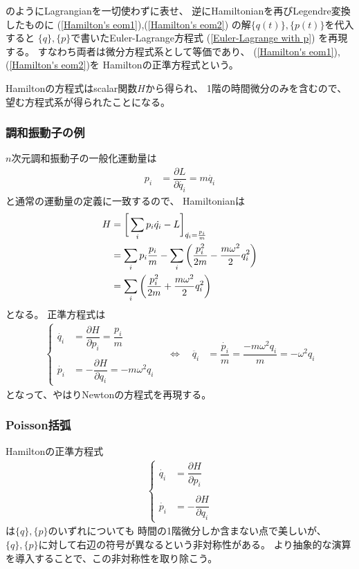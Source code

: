 のようにLagrangianを一切使わずに表せ、
逆にHamiltonianを再びLegendre変換したものに
(\ref{Hamilton's eom1}),(\ref{Hamilton's eom2})
の解$\{q(t)\},\{p(t)\}$を代入すると
$\{q\},\{p\}$で書いたEuler-Lagrange方程式
(\ref{Euler-Lagrange with p})
を再現する。
すなわち両者は微分方程式系として等価であり、
(\ref{Hamilton's eom1}), 
(\ref{Hamilton's eom2})を
Hamiltonの正準方程式という。

Hamiltonの方程式はscalar関数$H$から得られ、
1階の時間微分のみを含むので、
望む方程式系が得られたことになる。

\subsubsection{調和振動子の例}

$n$次元調和振動子の一般化運動量は
\begin{align}
  p_i &= \dfrac{\partial L}{\partial \dot{q_i}}
=
  m \dot{q_i}
\end{align}
と通常の運動量の定義に一致するので、
Hamiltonianは
\begin{align}
  H &= \bigg[
    \sum_i p_i \dot{q_i}
    - L
    \bigg]_{ \dot{q_i} = \frac{p_i}{m} }
\notag\\&=
    \sum_i p_i \frac{p_i}{m}
    - 
      \sum_i \bigg(
      \dfrac{p_i^2}{2m}
    -
      \dfrac{ m \omega^2 }{2}
      q_i^2
    \bigg)
\notag\\&=
    \sum_i \bigg(
      \dfrac{p_i^2}{2m}
    +
      \dfrac{ m \omega^2 }{2}
      q_i^2
    \bigg)
\end{align}
となる。
正準方程式は
\begin{align}
  \begin{cases}
    \dot{q_i} &= \dfrac{\partial H}{\partial p_i}
    = \dfrac{p_i}{m}
  \\\\
    \dot{p_i} &= - \dfrac{\partial H}{\partial q_i}
    = - m \omega^2 q_i  
  \end{cases}
\quad
\Leftrightarrow
\quad
  \ddot{q_i} &= \dfrac{\dot{p_i}}{m}
  = \dfrac{- m \omega^2 q_i}{m} 
  = - \omega^2 q_i
\end{align}
となって、やはりNewtonの方程式を再現する。

\subsubsection{Poisson括弧}

Hamiltonの正準方程式
\begin{align}
   \begin{cases}
      \dot{q_i} &= \dfrac{\partial H}{\partial p_i}
    \\\\
      \dot{p_i} &= - \dfrac{\partial H}{\partial q_i}
    \end{cases}
\label{Hamilton's eom}
\end{align}
は$\{q\},\{p\}$のいずれについても
時間の1階微分しか含まない点で美しいが、
$\{q\},\{p\}$に対して右辺の符号が異なるという非対称性がある。
より抽象的な演算を導入することで、この非対称性を取り除こう。

